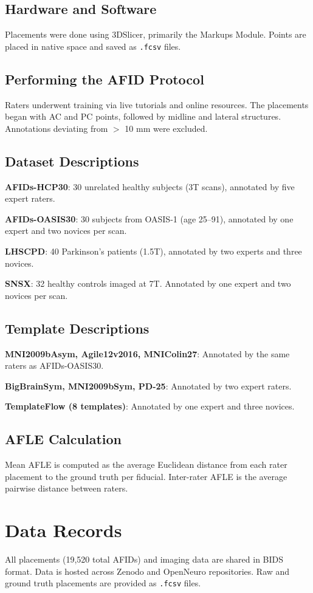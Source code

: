 \subsection{Hardware and Software}
Placements were done using 3DSlicer, primarily the Markups Module. Points are placed in native space and saved as \texttt{.fcsv} files.

\subsection{Performing the AFID Protocol}
Raters underwent training via live tutorials and online resources. The placements began with AC and PC points, followed by midline and lateral structures. Annotations deviating from $>$ 10 mm were excluded.

\subsection{Dataset Descriptions}
\textbf{AFIDs-HCP30}: 30 unrelated healthy subjects (3T scans), annotated by five expert raters.

\textbf{AFIDs-OASIS30}: 30 subjects from OASIS-1 (age 25--91), annotated by one expert and two novices per scan.

\textbf{LHSCPD}: 40 Parkinson's patients (1.5T), annotated by two experts and three novices.

\textbf{SNSX}: 32 healthy controls imaged at 7T. Annotated by one expert and two novices per scan.

\subsection{Template Descriptions}
\textbf{MNI2009bAsym, Agile12v2016, MNIColin27}: Annotated by the same raters as AFIDs-OASIS30.

\textbf{BigBrainSym, MNI2009bSym, PD-25}: Annotated by two expert raters.

\textbf{TemplateFlow (8 templates)}: Annotated by one expert and three novices.

\subsection{AFLE Calculation}
Mean AFLE is computed as the average Euclidean distance from each rater placement to the ground truth per fiducial. Inter-rater AFLE is the average pairwise distance between raters.

\section{Data Records}
All placements (19,520 total AFIDs) and imaging data are shared in BIDS format. Data is hosted across Zenodo and OpenNeuro repositories. Raw and ground truth placements are provided as \texttt{.fcsv} files.

